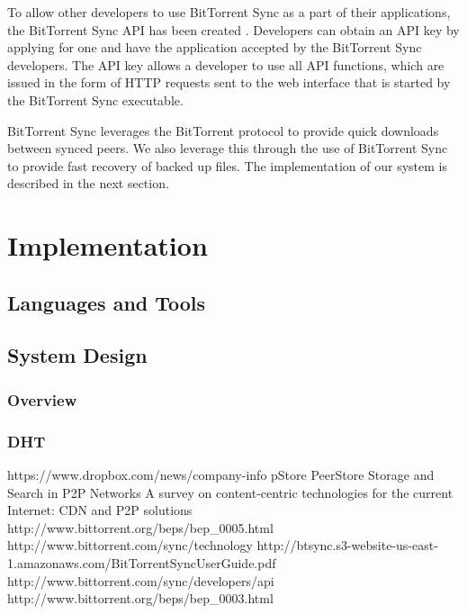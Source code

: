 \documentclass[12pt]{report}
\begin{document}
To allow other developers to use BitTorrent Sync as a part of their applications, the BitTorrent Sync API has been created \cite{btsyncapi}. Developers can obtain an API key by applying for one and have the application accepted by the BitTorrent Sync developers. The API key allows a developer to use all API functions, which are issued in the form of HTTP requests sent to the web interface that is started by the BitTorrent Sync executable.

BitTorrent Sync leverages the BitTorrent protocol to provide quick downloads between synced peers. We also leverage this through the use of BitTorrent Sync to provide fast recovery of backed up files. The implementation of our system is described in the next section.


\chapter{Implementation}
\section{Languages and Tools}
\section{System Design}
\subsection{Overview}
\subsection{}
\subsection{DHT}

\begin{thebibliography}{1}

 https://www.dropbox.com/news/company-info
 pStore
 PeerStore
 Storage and Search in P2P Networks
 A survey on content-centric technologies for the current Internet: CDN and P2P solutions
 http://www.bittorrent.org/beps/bep\_0005.html
 http://www.bittorrent.com/sync/technology
 http://btsync.s3-website-us-east-1.amazonaws.com/BitTorrentSyncUserGuide.pdf
 http://www.bittorrent.com/sync/developers/api
 http://www.bittorrent.org/beps/bep\_0003.html

\end{thebibliography}
\end{document}
